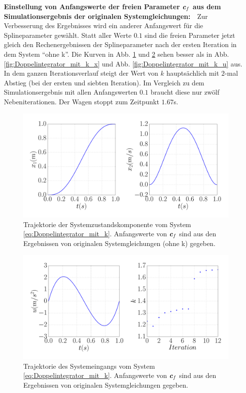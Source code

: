 \begin{beispiel}[Doppelintegrator]
	\textbf{Einstellung von Anfangswerte der freien Parameter $\boldsymbol c_{f}$ aus dem Simulationsergebnis der originalen Systemgleichungen:}~~Zur Verbesserung des Ergebnisses wird ein anderer Anfangswert für die Splineparameter gewählt. Statt aller Werte $0.1$ sind die freien Parameter jetzt gleich den Rechenergebnissen der Splineparameter nach der ersten Iteration in dem System ``ohne k''. Die Kurven in Abb. \ref{fig:Doppelintegrator_mit_k_x_aus} und \ref{fig:Doppelintegrator_mit_k_u_aus} sehen besser als in Abb. \ref{fig:Doppelintegrator_mit_k_x} und Abb. \ref{fig:Doppelintegrator_mit_k_u} aus. In dem ganzen Iterationsverlauf steigt der Wert von $k$ hauptsächlich mit $2$-mal Abstieg (bei der ersten und siebten Iteration). Im Vergleich zu dem Simulationsergebnis mit allen Anfangswerten $0.1$ braucht diese nur zwölf Nebeniterationen. Der Wagen stoppt zum Zeitpunkt $1.67$s. 
	
	\begin{figure}[!h]
		\centering
		\includegraphics[width=0.7\linewidth]{bild/30_32/test0_mit_k_Ite1_x.pdf}%
		\caption[Trajektorie der Systemzustandskomponente vom System \eqref{eq:Doppelintegrator_mit_k}.]{Trajektorie der Systemzustandskomponente vom System \eqref{eq:Doppelintegrator_mit_k}. Anfangswerte von $\boldsymbol c_{f}$ sind aus den Ergebnissen von originalen Systemgleichungen (ohne k) gegeben.}
		\label{fig:Doppelintegrator_mit_k_x_aus}
	\end{figure}

	\begin{figure}[!h]
		\centering
		\includegraphics[width=0.7\linewidth]{bild/30_32/test0_mit_k_Ite1_u.pdf}%
		\caption[Trajektorie des Systemeingangs vom System \eqref{eq:Doppelintegrator_mit_k}.]{Trajektorie des Systemeingangs vom System \eqref{eq:Doppelintegrator_mit_k}. Anfangswerte von $\boldsymbol c_{f}$ sind aus den Ergebnissen von originalen Systemgleichungen gegeben.}
		\label{fig:Doppelintegrator_mit_k_u_aus}
	\end{figure}
	
\end{beispiel}

